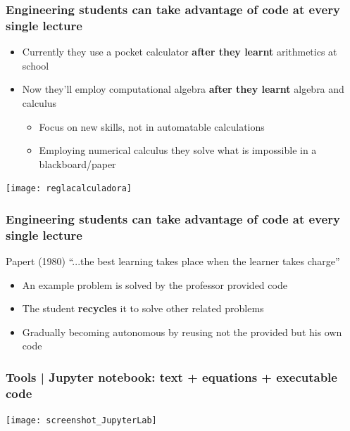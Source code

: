 \documentclass[aspectratio=169]{beamer}
\begin{document}
\begin{frame}
	\frametitle{Engineering students can take advantage of code at every single lecture}
	\pause
	\begin{block}{}
		\begin{itemize}[<+->]
			\item Currently they use a pocket calculator \textbf{after they learnt} arithmetics at school
			\item Now they'll employ computational algebra \textbf{after they learnt} algebra and calculus
			\begin{itemize}[<+->]
				\item Focus on new skills, not in automatable calculations
				\item Employing numerical calculus they solve what is impossible in a blackboard/paper
			\end{itemize}
			\end{itemize}
	\texttt{[image: reglacalculadora]}
	\uncover<3->{\texttt{[image: hard]}}
	\end{block}
\end{frame}


\begin{frame}
	\frametitle{Engineering students can take advantage of code at every single lecture}
	\pause
	\begin{block}{}
		Papert (1980) ``...the best learning takes place when the learner takes charge''
		\begin{itemize}[<+->]
			\item An example problem is solved by the professor provided code
			\item The student \textbf{recycles} it to solve other related problems
			\item Gradually becoming autonomous by reusing not the provided but his own code
		\end{itemize}
	\end{block}
\end{frame}





\begin{frame}
	\frametitle{Tools | Jupyter notebook: text + equations + executable code}
	\begin{block}{}
		\texttt{[image: screenshot\_JupyterLab]}
	\end{block}
\end{frame}
\end{document}
